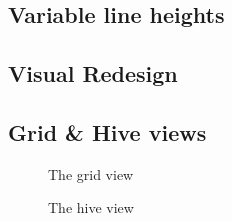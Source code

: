 	\subsection{Variable line heights} %
	\label{sec:variable_line_heights}
	

	\subsection{Visual Redesign} %
	\label{sec:visual_redesign}
	

	\subsection{Grid \& Hive views} %
	\label{sec:grid_&_hive_views}

\begin{figure}[ht]
\centering
\caption{The grid view}
\label{fig:grid}
\end{figure}

\begin{figure}[ht]
\centering
\caption{The hive view}
\label{fig:hive}
\end{figure}
	
